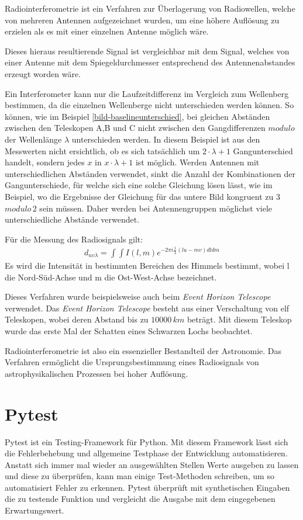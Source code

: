 \documentclass[]{dsadokumentation}
\begin{document}
Radiointerferometrie ist ein Verfahren zur Überlagerung von Radiowellen, welche von mehreren Antennen aufgezeichnet wurden, um eine höhere Auflösung zu erzielen als es mit einer einzelnen Antenne möglich wäre.

Dieses hieraus resultierende Signal ist vergleichbar mit dem Signal, welches von einer Antenne mit dem Spiegeldurchmesser entsprechend des Antennenabstandes erzeugt worden wäre.

Ein Interferometer kann nur die Laufzeitdifferenz im Vergleich zum Wellenberg bestimmen, da die einzelnen Wellenberge nicht unterschieden werden können. So können, wie im Beispiel  \ref{bild-baselineunterschied}, bei gleichen Abständen zwischen den Teleskopen A,B und C nicht zwischen den Gangdifferenzen $modulo$ der Wellenlänge $\lambda$ unterschieden werden. In diesem Beispiel ist aus den Messwerten nicht ersichtlich, ob es sich tatsächlich um $2\cdot \lambda +1$ Gangunterschied handelt, sondern jedes $x$ in $x\cdot\lambda+1$ ist möglich. Werden Antennen mit unterschiedlichen Abständen verwendet, sinkt die Anzahl der Kombinationen der Gangunterschiede, für welche sich eine solche Gleichung lösen lässt, wie im Beispiel, wo die Ergebnisse der Gleichung für das untere Bild kongruent zu 3 $modulo\,2$ sein müssen. Daher werden bei Antennengruppen möglichst viele unterschiedliche Abstände verwendet.

Für die Messung des Radiosignals gilt:
\begin{eqnarray}
d_{uv\lambda} =\int\int I(l,m)e^{-2\pi i \frac{1}{\lambda}(lu-mv)dldm}
\end{eqnarray}
Es wird die Intensität in bestimmten Bereichen des Himmels bestimmt, wobei l die Nord-Süd-Achse und m die Ost-West-Achse bezeichnet.

Dieses Verfahren wurde beispielsweise auch beim \emph{Event Horizon Telescope} verwendet. Das \emph{Event Horizon Telescope} besteht aus einer Verschaltung von elf Teleskopen, wobei deren Abstand bis zu $10000\,km$ beträgt. Mit diesem Teleskop wurde das erste Mal der Schatten eines Schwarzen Lochs beobachtet.

Radiointerferometrie ist also ein essenzieller Bestandteil der Astronomie. Das Verfahren ermöglicht die Ursprungsbestimmung eines Radiosignals von astrophysikalischen Prozessen bei hoher Auflösung.

\section{Pytest}
Pytest ist ein Testing-Framework für Python. Mit diesem Framework lässt sich die Fehlerbehebung und allgemeine Testphase der Entwicklung automatisieren. Anstatt sich immer mal wieder an ausgewählten Stellen Werte ausgeben zu lassen und diese zu überprüfen, kann man einige Test-Methoden schreiben, um so automatisiert Fehler zu erkennen. Pytest überprüft mit synthetischen Eingaben die zu testende Funktion und vergleicht die Ausgabe mit dem eingegebenen Erwartungswert.
\end{document}
